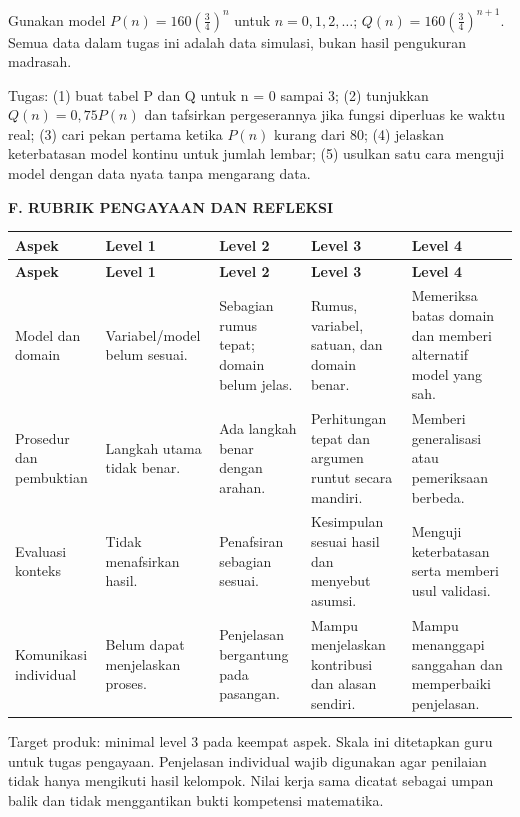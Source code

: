 \documentclass[11pt,a4paper]{article}
\begin{document}
Gunakan model \(P(n)=160\left(\frac{3}{4}\right)^n\) untuk \(n = 0, 1, 2, \ldots\); \(Q(n)=160\left(\frac{3}{4}\right)^{n+1}\). Semua data dalam tugas ini adalah data simulasi, bukan hasil pengukuran madrasah.\par\medskip
Tugas: (1) buat tabel P dan Q untuk n = 0 sampai 3; (2) tunjukkan \(Q(n)=0{,}75P(n)\) dan tafsirkan pergeserannya jika fungsi diperluas ke waktu real; (3) cari pekan pertama ketika \(P(n)\) kurang dari 80; (4) jelaskan keterbatasan model kontinu untuk jumlah lembar; (5) usulkan satu cara menguji model dengan data nyata tanpa mengarang data.\par\medskip
\clearpage
\begin{center}\bfseries\large F. RUBRIK PENGAYAAN DAN REFLEKSI\end{center}\medskip
{\small\setlength{\tabcolsep}{2mm}\renewcommand{\arraystretch}{1.35}\begin{longtable}{|>{\raggedright\arraybackslash}p{27.873mm}|>{\raggedright\arraybackslash}p{26.606mm}|>{\raggedright\arraybackslash}p{29.140mm}|>{\raggedright\arraybackslash}p{35.474mm}|>{\raggedright\arraybackslash}p{38.008mm}|}\hline
\rowcolor{gray!10}\textbf{Aspek} & \textbf{Level 1} & \textbf{Level 2} & \textbf{Level 3} & \textbf{Level 4}\\ \hline
\endfirsthead
\rowcolor{gray!10}\textbf{Aspek} & \textbf{Level 1} & \textbf{Level 2} & \textbf{Level 3} & \textbf{Level 4}\\ \hline
\endhead
Model dan domain & Variabel/model belum sesuai. & Sebagian rumus tepat; domain belum jelas. & Rumus, variabel, satuan, dan domain benar. & Memeriksa batas domain dan memberi alternatif model yang sah.\\ \hline
Prosedur dan pembuktian & Langkah utama tidak benar. & Ada langkah benar dengan arahan. & Perhitungan tepat dan argumen runtut secara mandiri. & Memberi generalisasi atau pemeriksaan berbeda.\\ \hline
Evaluasi konteks & Tidak menafsirkan hasil. & Penafsiran sebagian sesuai. & Kesimpulan sesuai hasil dan menyebut asumsi. & Menguji keterbatasan serta memberi usul validasi.\\ \hline
Komunikasi individual & Belum dapat menjelaskan proses. & Penjelasan bergantung pada pasangan. & Mampu menjelaskan kontribusi dan alasan sendiri. & Mampu menanggapi sanggahan dan memperbaiki penjelasan.\\ \hline
\end{longtable}}\medskip
{\small Target produk: minimal level 3 pada keempat aspek. Skala ini ditetapkan guru untuk tugas pengayaan. Penjelasan individual wajib digunakan agar penilaian tidak hanya mengikuti hasil kelompok. Nilai kerja sama dicatat sebagai umpan balik dan tidak menggantikan bukti kompetensi matematika.\par}\medskip
\end{document}
